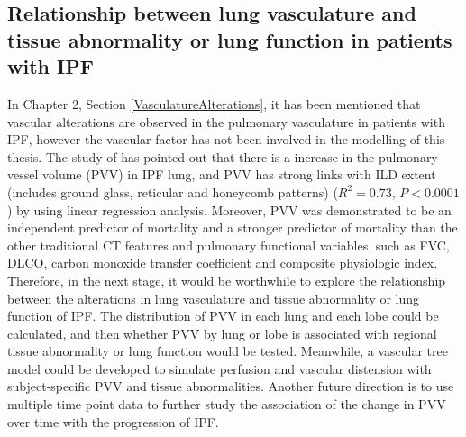 \subsection{Relationship between lung vasculature and tissue abnormality or lung function in patients with IPF}
In Chapter 2, Section \ref{VasculatureAlterations}, it has been mentioned that vascular alterations are observed in the pulmonary vasculature in patients with IPF, however the vascular factor has not been involved in the modelling of this thesis. The study of \cite{Jacob2016Evaluation,Jacob2016Mortality} has pointed out that there is a increase in the pulmonary vessel volume (PVV) in IPF lung, and PVV has strong links with ILD extent (includes ground glass, reticular and honeycomb patterns) ($R^2 = 0.73$, $P < 0.0001$) by using linear regression analysis. Moreover, PVV was demonstrated to be an independent predictor of mortality and a stronger predictor of mortality than the other traditional CT features and pulmonary functional variables, such as FVC, DLCO, carbon monoxide transfer coefficient and composite physiologic index. Therefore, in the next stage, it would be worthwhile to explore the relationship between the alterations in lung vasculature and tissue abnormality or lung function of IPF. The distribution of PVV in each lung and each lobe could be calculated, and then whether PVV by lung or lobe is associated with regional tissue abnormality or lung function would be tested. Meanwhile, a vascular tree model could be developed to simulate perfusion and vascular distension with subject-specific PVV and tissue abnormalities. Another future direction is to use multiple time point data to further study the association of the change in PVV over time with the progression of IPF.
